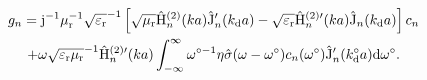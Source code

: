 \begin{figure*}
\setcounter{tempEQCounter}{\value{equation}}
\setcounter{equation}{24}
\begin{multline}
    g_n =  \mathrm{j}^{-1}\mu_{\mathrm{r}}^{-1}\sqrt{\varepsilon_{\mathrm{r}}}^{-1}\left[\sqrt{\mu_{\mathrm{r}}}\hat{\mathrm{H}}^{(2)}_n(ka)\hat{\mathrm{J}}_n'(k_{\mathrm{d}}a) -\sqrt{\varepsilon_{\mathrm{r}}}\hat{\mathrm{H}}^{(2)\prime}_n(ka)\hat{\mathrm{J}}_n(k_{\mathrm{d}}a)\right]c_n \\+ \omega\sqrt{\varepsilon_{\mathrm{r}}\mu_{\mathrm{r}}}^{-1}\hat{\mathrm{H}}^{(2)\prime}_n(ka)\int_{-\infty}^\infty \omega^{\circ-1} \eta\hat{\sigma}(\omega-\omega^\circ)c_n(\omega^\circ)\hat{\mathrm{J}}_n'(k^\circ_{\mathrm{d}}a) \mathrm{d}\omega^\circ.
    \label{eq:g-c-tm-long}
\end{multline}
\setcounter{equation}{\value{tempEQCounter}}
\hrulefill
\vspace*{4pt}
\end{figure*}
